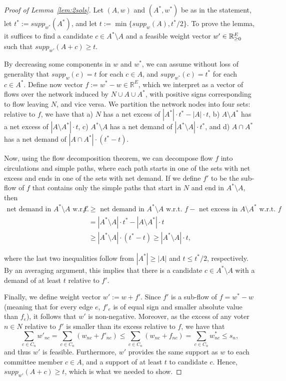 \begin{proof}[Proof of Lemma~\ref{lem:2sols}]
Let $(A,w)$ and $(A^*, w^*)$ be as in the statement, let $t^*:=supp_{w^*}(A^*)$, and let $t:=\min\{supp_w(A), t^*/2\}$. To prove the lemma, it suffices to find a candidate $c\in A^*\setminus A$ and a feasible weight vector $w'\in\mathbb{R}_{\geq 0}^E$ such that $supp_{w'}(A+c)\geq t$.

By decreasing some components in $w$ and $w^*$, we can assume without loss of generality that $supp_w(c)=t$ for each $c\in A$, and $supp_{w^*}(c)=t^*$ for each $c\in A^*$. Define now vector $f:=w^* - w\in\mathbb{R}^E$, which we interpret as a vector of flows over the network induced by $N\cup A\cup A^*$, with positive signs corresponding to flow leaving $N$, and vice versa. We partition the network nodes into four sets: relative to $f$, we have that a) $N$ has a net excess of $|A^*|\cdot t^* - |A|\cdot t$, b) $A\setminus A^*$ has a net excess of $|A\setminus A^*|\cdot t$, c) $A^*\setminus A$ has a net demand of $|A^*\setminus A|\cdot t^*$, and d) $A\cap A^*$ has a net demand of $|A\cap A^*|\cdot (t^*-t)$.

Now, using the flow decomposition theorem, we can decompose flow $f$ into circulations and simple paths, where each path starts in one of the sets with net excess and ends in one of the sets with net demand. If we define $f'$ to be the sub-flow of $f$ that contains only the simple paths that start in $N$ and end in $A^*\setminus A$, then %
%
\begin{align*}
    \text{net demand in $A^*\setminus A$ w.r.t. } f' &\geq \text{ net demand in $A^*\setminus A$ w.r.t. } f - \text{ net excess in $A\setminus A^*$ w.r.t. } f\\
    &= |A^*\setminus A|\cdot t^* - |A\setminus A^*|\cdot t\\
    &\geq |A^*\setminus A|\cdot (t^*-t) \geq |A^*\setminus A|\cdot t,
\end{align*}

where the last two inequalities follow from $|A^*|\geq |A|$ and $t\leq t^*/2$, respectively. By an averaging argument, this implies that there is a candidate $c\in A^*\setminus A$ with a demand of at least $t$ relative to $f'$.

Finally, we define weight vector $w':=w+f'$. Since $f'$ is a sub-flow of $f=w^* - w$ (meaning that for every edge $e$, $f'_e$ is of equal sign and smaller absolute value than $f_e$), it follows that $w'$ is non-negative. Moreover, as the excess of any voter $n\in N$ relative to $f'$ is smaller than its excess relative to $f$, we have that 
$$\sum_{c\in C_n} {w'}_{nc}=\sum_{c\in C_n} (w_{nc} + f'_{nc}) \leq \sum_{c\in C_n} (w_{nc} + f_{nc})=\sum_{c\in C_n} w^*_{nc} \leq s_n,$$ 
and thus $w'$ is feasible. Furthermore, $w'$ provides the same support as $w$ to each committee member $c\in A$, and a support of at least $t$ to candidate $c$. Hence, $supp_{w'}(A+c)\geq t$, which is what we needed to show.
\end{proof}

